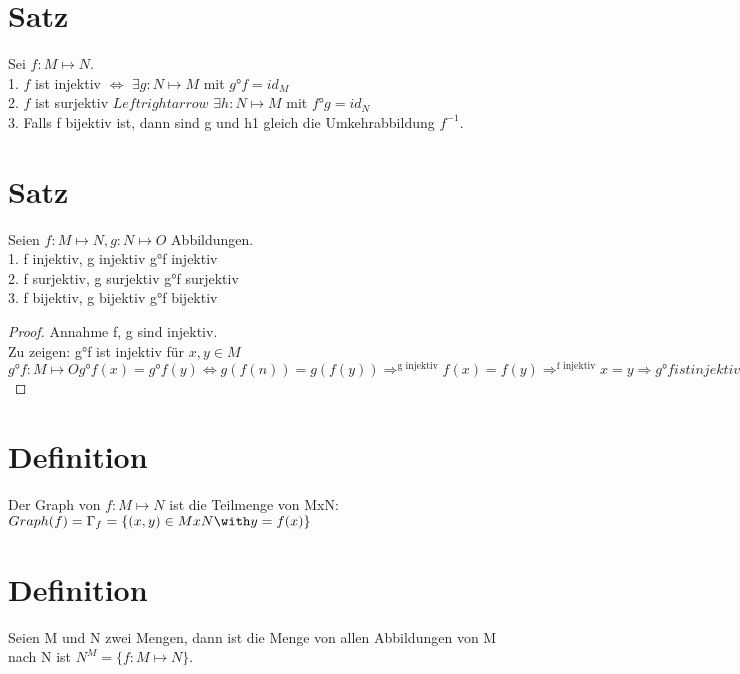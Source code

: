 \documentclass[a4paper,10pt]{article}
\begin{document}
\section{Satz}

Sei $f: M \mapsto N$.\\
1. $f$ ist injektiv $\Leftrightarrow$ $\exists g: N \mapsto M$ mit $g°f = id_M$\\
2. $f$ ist surjektiv $Leftrightarrow$ $\exists h: N \mapsto M$ mit $f°g = id_N$\\
3. Falls f bijektiv ist, dann sind g und h1 gleich die Umkehrabbildung $f^{-1}$.

\section{Satz}

Seien $f: M \mapsto N, g: N \mapsto O$ Abbildungen.\\
1. f injektiv, g injektiv \Rightarrow g°f injektiv\\
2. f surjektiv, g surjektiv \Rightarrow g°f surjektiv\\
3. f bijektiv, g bijektiv \Rightarrow g°f bijektiv

\begin{proof}
 Annahme f, g sind injektiv.\\
 Zu zeigen: g°f ist injektiv für $x, y \in M$\\
 
 \begin{equation}
  g°f: M \mapsto O
  g°f(x) = g°f(y) \Leftrightarrow g(f(n)) = g(f(y)) \Rightarrow^{\text{g injektiv}} f(x) = f(y) \Rightarrow^{\text{f injektiv}} x = y
  \Rightarrow g°f ist injektiv
 \end{equation}
\end{proof}

\section{Definition}

Der Graph von $f: M \mapsto N$ ist die Teilmenge von MxN:\\
$Graph(f) = \Gamma_f = \{ (x, y) \in MxN \with y = f(x) \}$ 

\section{Definition}

Seien M und N zwei Mengen, dann ist die Menge von allen Abbildungen von M nach N ist $N^M = \{ f: M \mapsto N \}$.
\end{document}
